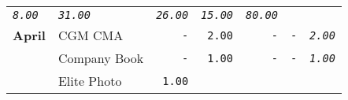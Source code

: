 \documentclass[11pt,A4paper,]{article}
\begin{document}
\begin{longtable}[]{@{}llrrrrr@{}}
\begin{minipage}[t]{0.14\columnwidth}
\emph{\texttt{8.00}}\strut
\end{minipage} & \begin{minipage}[t]{0.14\columnwidth}\raggedleft\strut
\emph{\texttt{31.00}}\strut
\end{minipage} & \begin{minipage}[t]{0.14\columnwidth}\raggedleft\strut
\emph{\texttt{26.00}}\strut
\end{minipage} & \begin{minipage}[t]{0.14\columnwidth}\raggedleft\strut
\emph{\texttt{15.00}}\strut
\end{minipage} & \begin{minipage}[t]{0.14\columnwidth}\raggedleft\strut
\emph{\texttt{80.00}}\strut
\end{minipage}\tabularnewline
\textbf{April} & CGM CMA & \texttt{-} & \texttt{2.00} & \texttt{-} &
\texttt{-} & \emph{\texttt{2.00}}\tabularnewline
\begin{minipage}[t]{0.14\columnwidth}\raggedright\strut
\strut
\end{minipage} & \begin{minipage}[t]{0.14\columnwidth}\raggedright\strut
Company Book\strut
\end{minipage} & \begin{minipage}[t]{0.14\columnwidth}\raggedleft\strut
\texttt{-}\strut
\end{minipage} & \begin{minipage}[t]{0.14\columnwidth}\raggedleft\strut
\texttt{1.00}\strut
\end{minipage} & \begin{minipage}[t]{0.14\columnwidth}\raggedleft\strut
\texttt{-}\strut
\end{minipage} & \begin{minipage}[t]{0.14\columnwidth}\raggedleft\strut
\texttt{-}\strut
\end{minipage} & \begin{minipage}[t]{0.14\columnwidth}\raggedleft\strut
\emph{\texttt{1.00}}\strut
\end{minipage}\tabularnewline
\begin{minipage}[t]{0.14\columnwidth}\raggedright\strut
\strut
\end{minipage} & \begin{minipage}[t]{0.14\columnwidth}\raggedright\strut
Elite Photo\strut
\end{minipage} & \begin{minipage}[t]{0.14\columnwidth}\raggedleft\strut
\texttt{1.00}\strut
\end{minipage} & \begin{minipage}[t]{0.14\columnwidth}\raggedleft\strut

\end{minipage}
\end{longtable}
\end{document}
